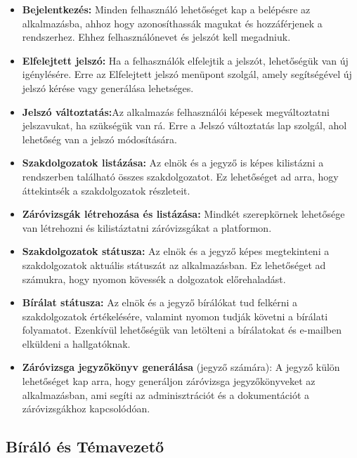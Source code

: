 \begin{itemize}

\item \textbf{Bejelentkezés:} Minden felhasználó lehetőséget kap a belépésre az alkalmazásba, ahhoz hogy azonosíthassák magukat és hozzáférjenek a rendszerhez. Ehhez felhasználónevet és jelszót kell megadniuk.

\item \textbf{Elfelejtett jelszó:} Ha a felhasználók elfelejtik a jelszót, lehetőségük van új igénylésére. Erre az Elfelejtett jelszó menüpont szolgál, amely segítségével új jelszó kérése vagy generálása lehetséges.

\item \textbf{Jelszó változtatás:}Az alkalmazás felhasználói képesek megváltoztatni jelszavukat, ha szükségük van rá. Erre a Jelszó változtatás lap szolgál, ahol lehetőség van a jelszó módosítására.

\item \textbf{Szakdolgozatok listázása:} Az elnök és a jegyző is képes kilistázni a rendszerben található összes szakdolgozatot. Ez lehetőséget ad arra, hogy áttekintsék a szakdolgozatok részleteit.

\item \textbf{Záróvizsgák létrehozása és listázása:} Mindkét szerepkörnek lehetősége van létrehozni és kilistáztatni záróvizsgákat a platformon.

\item \textbf{Szakdolgozatok státusza:} Az elnök és a jegyző képes megtekinteni a szakdolgozatok aktuális státuszát az alkalmazásban. Ez lehetőséget ad számukra, hogy nyomon kövessék a dolgozatok előrehaladást.

\item \textbf{Bírálat státusza:} Az elnök és a jegyző bírálókat tud felkérni a szakdolgozatok értékelésére, valamint nyomon tudják követni a bírálati folyamatot. Ezenkívül lehetőségük van letölteni a bírálatokat és e-mailben elküldeni a hallgatóknak.

\item \textbf{Záróvizsga jegyzőkönyv generálása} (jegyző számára): A jegyző külön lehetőséget kap arra, hogy generáljon záróvizsga jegyzőkönyveket az alkalmazásban, ami segíti az adminisztrációt és a dokumentációt a záróvizsgákhoz kapcsolódóan.
\end{itemize}



\subsection{Bíráló és Témavezető}

